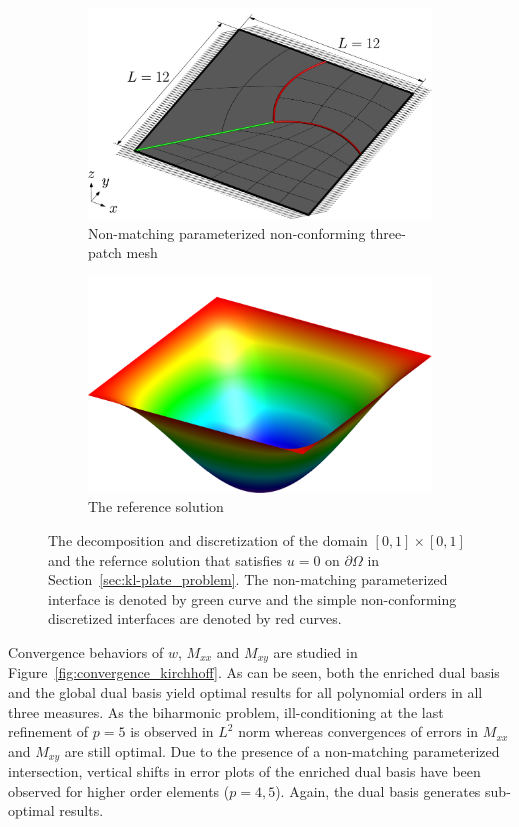 \begin{figure}[ht]
	\center
	\begin{subfigure}[t]{.45\linewidth}
		\center
		\includegraphics[scale=.4]{plate_config-plot}
		\caption{Non-matching parameterized non-conforming three-patch mesh}
	\end{subfigure}
	\begin{subfigure}[t]{.45\linewidth}
		\center
		\includegraphics[scale=.3]{plate_solution-plot}
		\caption{The reference solution}
	\end{subfigure}
	\caption{The decomposition and discretization of the domain $\left[0, 1\right] \times \left[0, 1\right]$ and the refernce solution that satisfies $u=0$ on $\partial\Omega$ in Section~\ref{sec:kl-plate_problem}. The non-matching parameterized interface is denoted by green curve and the simple non-conforming discretized interfaces are denoted by red curves.}\label{fig:kirchhoff_mesh}
\end{figure}
Convergence behaviors of $w$, $M_{xx}$ and $M_{xy}$ are studied in Figure~\ref{fig:convergence_kirchhoff}. As can be seen, both the enriched dual basis and the global dual basis yield optimal results for all polynomial orders in all three measures. As the biharmonic problem, ill-conditioning at the last refinement of $p=5$ is observed in $L^2$ norm whereas convergences of errors in $M_{xx}$ and $M_{xy}$ are still optimal. Due to the presence of a non-matching parameterized intersection, vertical shifts in error plots of the enriched dual basis have been observed for higher order elements ($p = 4,5$). Again, the \Bezier dual basis generates sub-optimal results. \par

